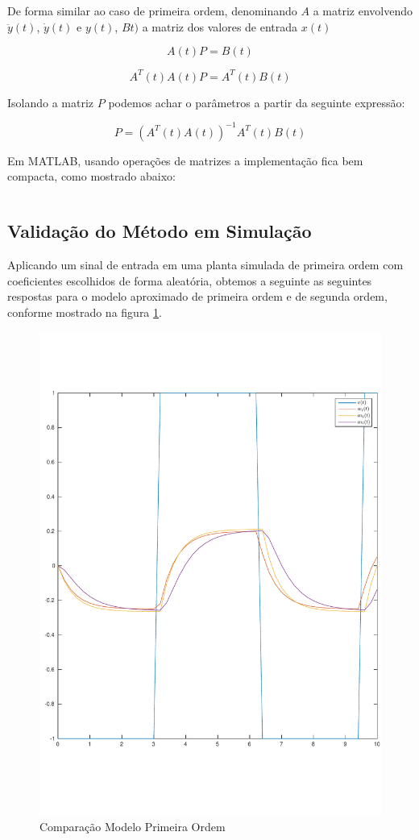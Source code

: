 \documentclass[a4paper,11pt]{article}
\begin{document}

De forma similar ao caso de primeira ordem, denominando $A$ a matriz envolvendo $\ddot{y}(t)$, $\dot{y}(t)$ e $y(t)$, $Bt)$ a matriz dos valores de entrada $x(t)$

\begin{equation}
    A(t) P = B(t)
\end{equation}

\begin{equation}
    A^T(t)A(t) P = A^T(t) B(t)
\end{equation}

Isolando a matriz $P$ podemos achar o parâmetros a partir da seguinte expressão:

\begin{equation}
    P = \left(A^T(t) A(t)\right)^{-1} A^T(t) B(t)
\end{equation}

Em MATLAB, usando operações de matrizes a implementação fica bem compacta, como mostrado abaixo:

\inputminted[frame=single,framesep=10pt]{matlab}{../src/matlab/secondordertf.m}

\subsection{Validação do Método em Simulação}

Aplicando um sinal de entrada em uma planta simulada de primeira ordem com coeficientes escolhidos de forma aleatória, obtemos a seguinte as seguintes respostas para o modelo aproximado de primeira ordem e de segunda ordem, conforme mostrado na figura \ref{fig:model1Evaluation}.

\begin{figure}[H]
    \centering
    \includegraphics[width=0.6\linewidth]{tex/img/model1Evaluation.pdf}
    \caption{Comparação Modelo Primeira Ordem}
    \label{fig:model1Evaluation}
\end{figure}
\end{document}
